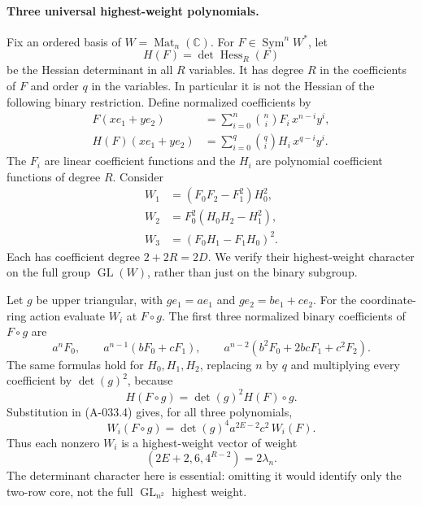 \paragraph{Three universal highest-weight polynomials.}
Fix an ordered basis of \(W=\operatorname{Mat}_n(\mathbb C)\).
For \(F\in\operatorname{Sym}^nW^*\), let
\[
                 H(F)=\det\operatorname{Hess}_{R}(F)
\]
be the Hessian determinant in all \(R\) variables.
It has degree \(R\) in the coefficients of \(F\) and order
\(q\) in the variables. In particular it is not the Hessian
of the following binary restriction.
Define normalized coefficients by
\[
 \begin{split}
 F(xe_1+ye_2)&=\sum_{i=0}^n\binom ni F_i\,x^{n-i}y^i,\\
 H(F)(xe_1+ye_2)&=\sum_{i=0}^{q}\binom qi H_i\,x^{q-i}y^i.
 \end{split}                                                   \tag{A-033.3}
\]
The \(F_i\) are linear coefficient functions and the \(H_i\)
are polynomial coefficient functions of degree \(R\).
Consider
\[
 \begin{split}
 W_1&=(F_0F_2-F_1^2)H_0^2,\\
 W_2&=F_0^2(H_0H_2-H_1^2),\\
 W_3&=(F_0H_1-F_1H_0)^2.
 \end{split}                                                   \tag{A-033.4}
\]
Each has coefficient degree \(2+2R=2D\).
We verify their highest-weight character on the full group
\(\operatorname{GL}(W)\), rather than just on the binary subgroup.

Let \(g\) be upper triangular, with
\(ge_1=a e_1\) and \(ge_2=b e_1+c e_2\).
For the coordinate-ring action evaluate \(W_i\) at \(F\circ g\).
The first three normalized binary coefficients of \(F\circ g\) are
\[
 a^nF_0,\qquad
 a^{n-1}(bF_0+cF_1),\qquad
 a^{n-2}(b^2F_0+2bcF_1+c^2F_2).
                                                               \tag{A-033.5}
\]
The same formulas hold for \(H_0,H_1,H_2\), replacing
\(n\) by \(q\) and multiplying every coefficient by
\(\det(g)^2\), because
\[
                         H(F\circ g)=\det(g)^2 H(F)\circ g.
\]
Substitution in (A-033.4) gives, for all three polynomials,
\[
                 W_i(F\circ g)=
           \det(g)^4 a^{2E-2}c^2\,W_i(F).                      \tag{A-033.6}
\]
Thus each nonzero \(W_i\) is a highest-weight vector of weight
\[
                 (2E+2,6,4^{R-2})=2\lambda_n.                  \tag{A-033.7}
\]
The determinant character here is essential: omitting it
would identify only the two-row core, not the full
\(\operatorname{GL}_{n^2}\) highest weight.

